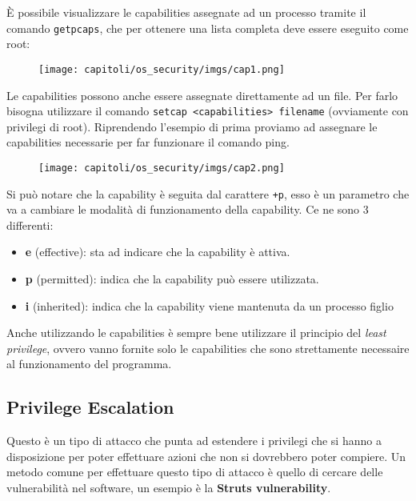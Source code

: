 È possibile visualizzare le capabilities assegnate ad un processo tramite il comando
\verb|getpcaps|, che per ottenere una lista completa deve essere eseguito come root:

\begin{figure}[H]
    \centering
    \texttt{[image: capitoli/os\_security/imgs/cap1.png]}
\end{figure}

Le capabilities possono anche essere assegnate direttamente ad un file.
Per farlo bisogna utilizzare il comando \verb|setcap <capabilities> filename|
(ovviamente con privilegi di root). Riprendendo l'esempio di prima proviamo ad
assegnare le capabilities necessarie per far funzionare il comando ping.

\begin{figure}[H]
    \centering
    \texttt{[image: capitoli/os\_security/imgs/cap2.png]}
\end{figure}

Si può notare che la capability è seguita dal carattere \verb|+p|, esso è un
parametro che va a cambiare le modalità di funzionamento della capability.
Ce ne sono 3 differenti:

\begin{itemize}
    \item \textbf{e} (effective): sta ad indicare che la capability è attiva.
    \item \textbf{p} (permitted): indica che la capability può essere utilizzata.
    \item \textbf{i} (inherited): indica che la capability viene mantenuta
          da un processo figlio
\end{itemize}

Anche utilizzando le capabilities è sempre bene utilizzare il principio del
\textit{least privilege}, ovvero vanno fornite solo le capabilities che sono
strettamente necessaire al funzionamento del programma.

\subsection{Privilege Escalation}

Questo è un tipo di attacco che punta ad estendere i privilegi che si hanno a
disposizione per poter effettuare azioni che non si dovrebbero poter compiere.
Un metodo comune per effettuare questo tipo di attacco è quello di cercare delle
vulnerabilità nel software, un esempio è la \textbf{Struts vulnerability}.